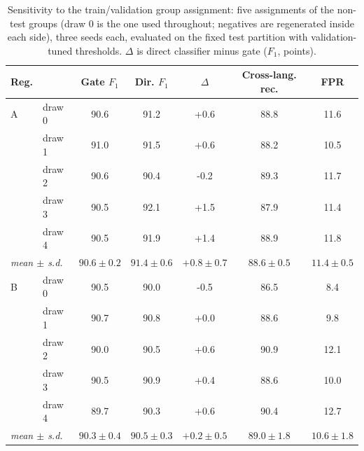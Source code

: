 \begin{table}[t]
\centering
\caption{Sensitivity to the train/validation group assignment: five assignments of the non-test groups (draw 0 is the one used throughout; negatives are regenerated inside each side), three seeds each, evaluated on the fixed test partition with validation-tuned thresholds. $\Delta$ is direct classifier minus gate ($F_1$, points).}
\label{tab:split-variance}
\footnotesize
\setlength{\tabcolsep}{2.5pt}
\begin{tabular}{llccccc}
\toprule
\textbf{Reg.} & & Gate $F_1$ & Dir. $F_1$ & $\Delta$ & Cross-lang. rec. & FPR \\
\midrule
A & draw 0 & 90.6 & 91.2 & +0.6 & 88.8 & 11.6 \\
 & draw 1 & 91.0 & 91.5 & +0.6 & 88.2 & 10.5 \\
 & draw 2 & 90.6 & 90.4 & -0.2 & 89.3 & 11.7 \\
 & draw 3 & 90.5 & 92.1 & +1.5 & 87.9 & 11.4 \\
 & draw 4 & 90.5 & 91.9 & +1.4 & 88.9 & 11.8 \\
\multicolumn{2}{l}{\emph{mean $\pm$ s.d.}} & $90.6\pm0.2$ & $91.4\pm0.6$ & $+0.8\pm0.7$ & $88.6\pm0.5$ & $11.4\pm0.5$ \\
\midrule
B & draw 0 & 90.5 & 90.0 & -0.5 & 86.5 & 8.4 \\
 & draw 1 & 90.7 & 90.8 & +0.0 & 88.6 & 9.8 \\
 & draw 2 & 90.0 & 90.5 & +0.6 & 90.9 & 12.1 \\
 & draw 3 & 90.5 & 90.9 & +0.4 & 88.6 & 10.0 \\
 & draw 4 & 89.7 & 90.3 & +0.6 & 90.4 & 12.7 \\
\multicolumn{2}{l}{\emph{mean $\pm$ s.d.}} & $90.3\pm0.4$ & $90.5\pm0.3$ & $+0.2\pm0.5$ & $89.0\pm1.8$ & $10.6\pm1.8$ \\
\bottomrule
\end{tabular}
\end{table}